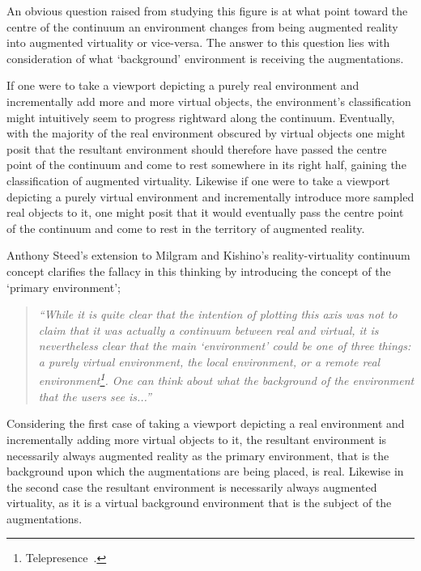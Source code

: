 An obvious question raised from studying this figure is at what point toward the centre of the continuum an environment changes from being augmented reality into augmented virtuality or vice-versa. The answer to this question lies with consideration of what `background' environment is receiving the augmentations.

If one were to take a viewport depicting a purely real environment and incrementally add more and more virtual objects, the environment's classification might intuitively seem to progress rightward along the continuum. Eventually, with the majority of the real environment obscured by virtual objects one might posit that the resultant environment should therefore have passed the centre point of the continuum and come to rest somewhere in its right half, gaining the classification of augmented virtuality. Likewise if one were to take a viewport depicting a purely virtual environment and incrementally introduce more sampled real objects to it, one might posit that it would eventually pass the centre point of the continuum and come to rest in the territory of augmented reality.

Anthony Steed's extension to Milgram and Kishino's reality-virtuality continuum concept clarifies the fallacy in this thinking by introducing the concept of the `primary environment';

\begin{quote}
\textit{``While it is quite clear that the intention of plotting this axis was not to claim that it was actually a continuum between real and virtual, it is nevertheless clear that the main `environment' could be one of three things: a purely virtual environment, the local environment, or a remote real environment\footnote{Telepresence~\cite{Sheridan1992a}.}. One can think about what the background of the environment that the users see is...''}~\cite{Steed2014}
\end{quote}

Considering the first case of taking a viewport depicting a real environment and incrementally adding more virtual objects to it, the resultant environment is necessarily always augmented reality as the primary environment, that is the background upon which the augmentations are being placed, is real. Likewise in the second case the resultant environment is necessarily always augmented virtuality, as it is a virtual background environment that is the subject of the augmentations.


